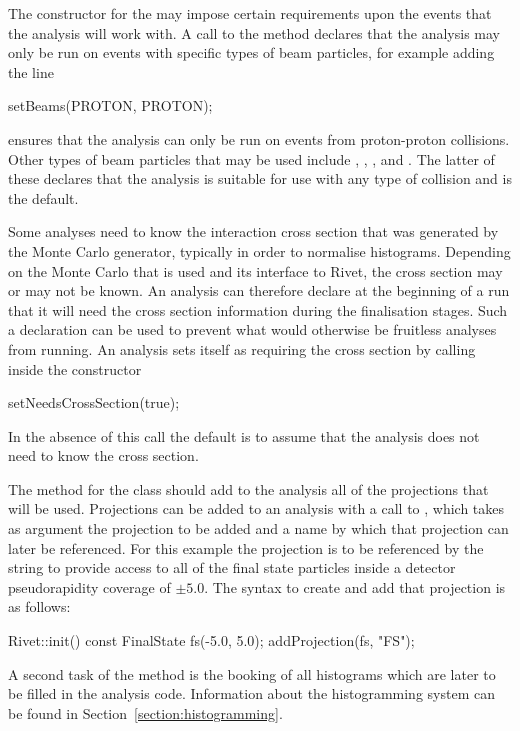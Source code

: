 \documentclass{JHEP3}
\begin{document}
The constructor for the  may impose certain
requirements upon the events that the analysis will work with.  A call to the
 method declares that the analysis may only be run on events with
specific types of beam particles, for example adding the line
%
\begin{snippet}
  setBeams(PROTON, PROTON);
\end{snippet}
%
\noindent ensures that the analysis can only be run on events from proton-proton
collisions.  Other types of beam particles that may be used include
, , ,  and .
The latter of these declares that the analysis is suitable for use with any type
of collision and is the default.

Some analyses need to know the interaction cross section that was generated by
the Monte Carlo generator, typically in order to normalise histograms.
Depending on the Monte Carlo that is used and its interface to Rivet, the cross
section may or may not be known.  An analysis can therefore declare at the
beginning of a run that it will need the cross section information during the
finalisation stages.  Such a declaration can be used to prevent what would
otherwise be fruitless analyses from running.  An analysis sets itself as
requiring the cross section by calling inside the constructor
%
\begin{snippet}
  setNeedsCrossSection(true);
\end{snippet}
%
\noindent In the absence of this call the default is to assume that the analysis
does not need to know the cross section.

The  method for the  class should add to the analysis all
of the projections that will be used.  Projections can be added to an analysis
with a call to , which takes as
argument the projection to be added and a name by which that projection can
later be referenced.  For this example the  projection is to be
referenced by the string  to provide access to all of the final state
particles inside a detector pseudorapidity coverage of $\pm 5.0$.  The syntax to
create and add that projection is as follows:
%
\begin{snippet}
Rivet::init() {
  const FinalState fs(-5.0, 5.0);
  addProjection(fs, "FS");
}
\end{snippet}
%
A second task of the  method is the booking of all histograms which
are later to be filled in the analysis code. Information about the histogramming
system can be found in Section~\ref{section:histogramming}.
\end{document}
